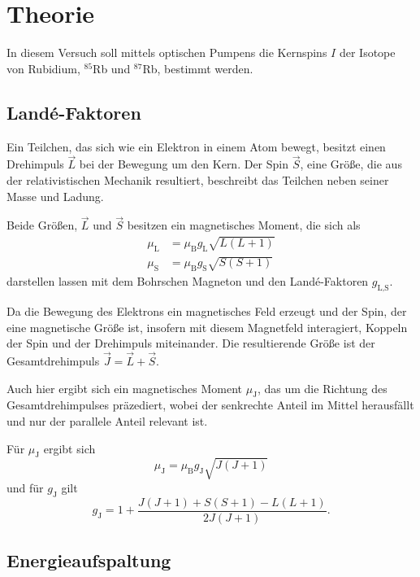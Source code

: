 \section{Theorie}
\label{sec:Theorie}

In diesem Versuch soll mittels optischen Pumpens die Kernspins $I$ der Isotope von Rubidium, $^{85}$Rb und $^{87}$Rb, bestimmt werden.

\subsection{Landé-Faktoren}

Ein Teilchen, das sich wie ein Elektron in einem Atom bewegt, besitzt einen Drehimpuls $\vec L$ bei der Bewegung um den Kern. 
Der Spin $\vec S$, eine Größe, die aus der relativistischen Mechanik resultiert, beschreibt das Teilchen neben seiner Masse und Ladung. 

Beide Größen, $\vec L$ und $\vec S$ besitzen ein magnetisches Moment, die sich als 
\begin{align*}
    \mu_\text{L} &= \mu_\text{B} g_\text{L} \sqrt{L(L+1)} \\ 
    \mu_\text{S} &= \mu_\text{B} g_\text{S} \sqrt{S(S+1)}
\end{align*}
darstellen lassen mit dem Bohrschen Magneton und den Landé-Faktoren $g_\text{L,S}$. 

Da die Bewegung des Elektrons ein magnetisches Feld erzeugt und der Spin, der eine magnetische Größe ist, insofern mit diesem Magnetfeld interagiert, Koppeln der Spin und der Drehimpuls miteinander. 
Die resultierende Größe ist der Gesamtdrehimpuls $\vec J = \vec L + \vec S$. 

Auch hier ergibt sich ein magnetisches Moment $\mu_\text{J}$, das um die Richtung des Gesamtdrehimpulses präzediert, wobei der senkrechte Anteil im Mittel herausfällt und nur der parallele Anteil relevant ist. 

Für $\mu_\text{J}$ ergibt sich 
\begin{equation*}
    \mu_\text{J} = \mu_\text{B} g_\text{J} \sqrt{J(J+1)}
\end{equation*}
und für $g_\text{J}$ gilt 
\begin{equation*}
    g_\text{J} = 1 + \frac{J(J+1) + S(S+1) - L(L+1)}{2J(J+1)}.
\end{equation*}

\subsection{Energieaufspaltung}

